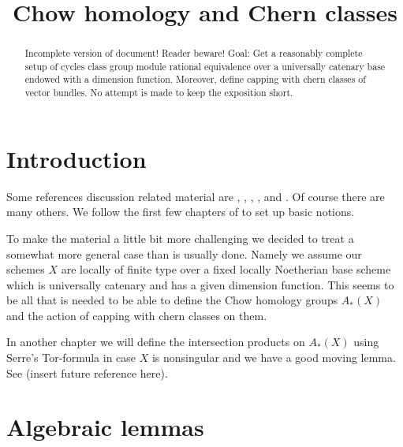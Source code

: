 

%


\title{Chow homology and Chern classes}

\begin{abstract}
Incomplete version of document! Reader beware!
Goal: Get a reasonably complete setup of
cycles class group module rational equivalence
over a universally catenary base endowed with a dimension
function. Moreover, define capping with chern classes of
vector bundles. No attempt is made to keep the exposition short.
\end{abstract}

\maketitle

\label{section-phantom}


\tableofcontents



\section{Introduction}
\label{section-introduction}

\noindent
Some references discussion related material are \cite{Serre_local_algebra},
\cite{Serre_algebre_locale}, \cite{Samuel}, \cite{ChevalleyI},
and \cite{ChevalleyII}. Of course there are many others.
We follow the first few chapters of \cite{F} to set up basic notions.

\medskip\noindent
To make the material a little bit more challenging we decided
to treat a somewhat more general case than is usually done.
Namely we assume our schemes $X$ are locally of finite type
over a fixed locally Noetherian base scheme which is universally
catenary and has a given dimension function. This seems to be
all that is needed to be able to define the Chow homology
groups $A_*(X)$ and the action of capping with chern classes
on them.

\medskip\noindent
In another chapter we will define the intersection products
on $A_*(X)$ using Serre's Tor-formula in case $X$ is nonsingular
and we have a good moving lemma. See (insert future reference here).



\section{Algebraic lemmas}
\label{section-algebraic-lemmas}

